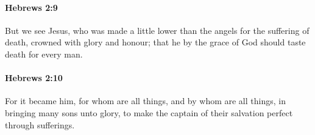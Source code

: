 		\paragraph{Hebrews 2:9} %
			\label{HEBREWS-2-9}

			But we see Jesus, who was made a little lower than the angels for the suffering of death, crowned with glory and honour; that he by the grace of God should taste death for every man.

			\begin{framed}
			\scriptsize
				\begin{compactdesc}
					\item[SBLG] 
				\end{compactdesc}
			\end{framed}

		\paragraph{Hebrews 2:10} %
			\label{HEBREWS-2-10}

			For it became him, for whom are all things, and by whom are all things, in bringing many sons unto glory, to make the captain of their salvation perfect through sufferings.

